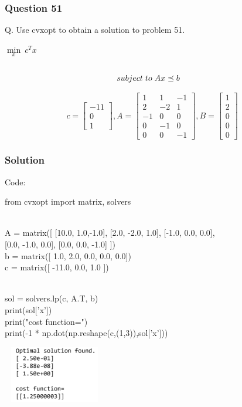 \documentclass{beamer}
\begin{document}
\begin{frame}
\frametitle{Question 51}
Q. Use cvxopt to obtain a solution to problem 51.  
 \begin{center}

 $\min\limits_{x}\ c^Tx$
\begin{alignat*}{2}
  \\subject\hspace{0.1cm} to\hspace{0.1cm}  Ax &\preceq b
\end{alignat*}

\end{center}
\[
c = 
\begin{bmatrix}
-11 
\\0
\\1
\end{bmatrix}
,A = 
\begin{bmatrix}
1  & 1 & -1
\\2  & -2 & 1
\\-1  & 0 & 0
\\0  & -1 & 0
\\0 & 0 & -1
\end{bmatrix}
,B = 
\begin{bmatrix}
1
\\2 
\\0 
\\0
\\0
\end{bmatrix}
\]
\end{frame}

\begin{frame}
\frametitle{Solution}
\begin{block}{Code:}

from cvxopt import matrix, solvers \vspace{0.5cm}

\\ A = matrix([ [10.0, 1.0,-1.0],
            [2.0, -2.0, 1.0],
            [-1.0, 0.0, 0.0],
 \\ \hspace{2cm}         [0.0, -1.0, 0.0], 
            [0.0, 0.0, -1.0]  ])
\\ b = matrix([ 1.0, 2.0, 0.0, 0.0, 0.0])
\\ c = matrix([ -11.0, 0.0, 1.0 ])

\\ sol = solvers.lp(c, A.T, b)
\\ print(sol['x'])
\\ print("cost function=")
\\ print(-1 * np.dot(np.reshape(c,(1,3)),sol['x']))
 \end{block}
  \includegraphics[width=4.5cm,height=2.5cm,angle=0]{Capture}
\end{frame}
\end{document}
